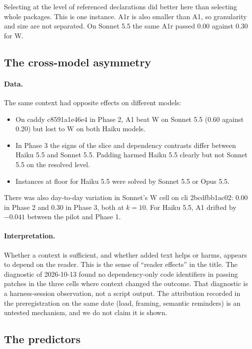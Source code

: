 Selecting at the level of referenced declarations did better here than selecting whole packages. This is one instance. A1r is also smaller than A1, so granularity and size are not separated. On Sonnet 5.5 the same A1r passed 0.00 against 0.30 for W.

\subsection{The cross-model asymmetry}

\paragraph{Data.} The same context had opposite effects on different models:
\begin{itemize}
\item On caddy c8591a1e46e4 in Phase 2, A1 beat W on Sonnet 5.5 (0.60 against 0.20) but lost to W on both Haiku models.
\item In Phase 3 the signs of the slice and dependency contrasts differ between Haiku 5.5 and Sonnet 5.5. Padding harmed Haiku 5.5 clearly but not Sonnet 5.5 on the resolved level.
\item Instances at floor for Haiku 5.5 were solved by Sonnet 5.5 or Opus 5.5.
\end{itemize}

There was also day-to-day variation in Sonnet's W cell on cli 2bcdfbb1ac02: 0.00 in Phase 2 and 0.30 in Phase 3, both at $k=10$. For Haiku 5.5, A1 drifted by $-0.041$ between the pilot and Phase 1.

\paragraph{Interpretation.} Whether a context is sufficient, and whether added text helps or harms, appears to depend on the reader. This is the sense of ``reader effects'' in the title. The diagnostic of 2026-10-13 found no dependency-only code identifiers in passing patches in the three cells where context changed the outcome. That diagnostic is a harness-session observation, not a script output. The attribution recorded in the preregistration on the same date (load, framing, semantic reminders) is an untested mechanism, and we do not claim it is shown.

\subsection{The predictors}

